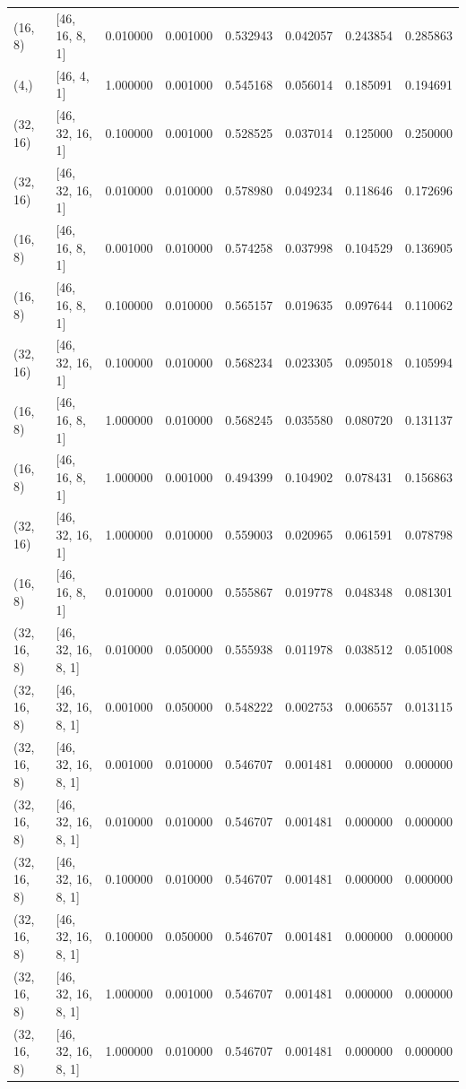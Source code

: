 \begin{tabular}{llrrrrrr}
(16, 8) & [46, 16, 8, 1] & 0.010000 & 0.001000 & 0.532943 & 0.042057 & 0.243854 & 0.285863 \\
(4,) & [46, 4, 1] & 1.000000 & 0.001000 & 0.545168 & 0.056014 & 0.185091 & 0.194691 \\
(32, 16) & [46, 32, 16, 1] & 0.100000 & 0.001000 & 0.528525 & 0.037014 & 0.125000 & 0.250000 \\
(32, 16) & [46, 32, 16, 1] & 0.010000 & 0.010000 & 0.578980 & 0.049234 & 0.118646 & 0.172696 \\
(16, 8) & [46, 16, 8, 1] & 0.001000 & 0.010000 & 0.574258 & 0.037998 & 0.104529 & 0.136905 \\
(16, 8) & [46, 16, 8, 1] & 0.100000 & 0.010000 & 0.565157 & 0.019635 & 0.097644 & 0.110062 \\
(32, 16) & [46, 32, 16, 1] & 0.100000 & 0.010000 & 0.568234 & 0.023305 & 0.095018 & 0.105994 \\
(16, 8) & [46, 16, 8, 1] & 1.000000 & 0.010000 & 0.568245 & 0.035580 & 0.080720 & 0.131137 \\
(16, 8) & [46, 16, 8, 1] & 1.000000 & 0.001000 & 0.494399 & 0.104902 & 0.078431 & 0.156863 \\
(32, 16) & [46, 32, 16, 1] & 1.000000 & 0.010000 & 0.559003 & 0.020965 & 0.061591 & 0.078798 \\
(16, 8) & [46, 16, 8, 1] & 0.010000 & 0.010000 & 0.555867 & 0.019778 & 0.048348 & 0.081301 \\
(32, 16, 8) & [46, 32, 16, 8, 1] & 0.010000 & 0.050000 & 0.555938 & 0.011978 & 0.038512 & 0.051008 \\
(32, 16, 8) & [46, 32, 16, 8, 1] & 0.001000 & 0.050000 & 0.548222 & 0.002753 & 0.006557 & 0.013115 \\
(32, 16, 8) & [46, 32, 16, 8, 1] & 0.001000 & 0.010000 & 0.546707 & 0.001481 & 0.000000 & 0.000000 \\
(32, 16, 8) & [46, 32, 16, 8, 1] & 0.010000 & 0.010000 & 0.546707 & 0.001481 & 0.000000 & 0.000000 \\
(32, 16, 8) & [46, 32, 16, 8, 1] & 0.100000 & 0.010000 & 0.546707 & 0.001481 & 0.000000 & 0.000000 \\
(32, 16, 8) & [46, 32, 16, 8, 1] & 0.100000 & 0.050000 & 0.546707 & 0.001481 & 0.000000 & 0.000000 \\
(32, 16, 8) & [46, 32, 16, 8, 1] & 1.000000 & 0.001000 & 0.546707 & 0.001481 & 0.000000 & 0.000000 \\
(32, 16, 8) & [46, 32, 16, 8, 1] & 1.000000 & 0.010000 & 0.546707 & 0.001481 & 0.000000 & 0.000000 \\

\end{tabular}
